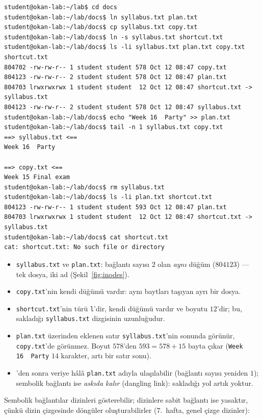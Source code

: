 \begin{lstlisting}[style=term]
student@okan-lab:~/lab$ cd docs
student@okan-lab:~/lab/docs$ ln syllabus.txt plan.txt
student@okan-lab:~/lab/docs$ cp syllabus.txt copy.txt
student@okan-lab:~/lab/docs$ ln -s syllabus.txt shortcut.txt
student@okan-lab:~/lab/docs$ ls -li syllabus.txt plan.txt copy.txt shortcut.txt
804702 -rw-rw-r-- 1 student student 578 Oct 12 08:47 copy.txt
804123 -rw-rw-r-- 2 student student 578 Oct 12 08:47 plan.txt
804703 lrwxrwxrwx 1 student student  12 Oct 12 08:47 shortcut.txt -> syllabus.txt
804123 -rw-rw-r-- 2 student student 578 Oct 12 08:47 syllabus.txt
student@okan-lab:~/lab/docs$ echo "Week 16  Party" >> plan.txt
student@okan-lab:~/lab/docs$ tail -n 1 syllabus.txt copy.txt
==> syllabus.txt <==
Week 16  Party

==> copy.txt <==
Week 15 Final exam
student@okan-lab:~/lab/docs$ rm syllabus.txt
student@okan-lab:~/lab/docs$ ls -li plan.txt shortcut.txt
804123 -rw-rw-r-- 1 student student 593 Oct 12 08:47 plan.txt
804703 lrwxrwxrwx 1 student student  12 Oct 12 08:47 shortcut.txt -> syllabus.txt
student@okan-lab:~/lab/docs$ cat shortcut.txt
cat: shortcut.txt: No such file or directory
\end{lstlisting}

\begin{itemize}
  \item \texttt{syllabus.txt} ve \texttt{plan.txt}: bağlantı sayısı $2$ olan \emph{aynı} düğüm ($804123$) --- tek dosya, iki ad (Şekil~\ref{fig:inodes}).
  \item \texttt{copy.txt}'nin kendi düğümü vardır: aynı baytları taşıyan ayrı bir dosya.
  \item \texttt{shortcut.txt}'nin türü \texttt{l}'dir, kendi düğümü vardır ve boyutu $12$'dir; bu, sakladığı \texttt{syllabus.txt} dizgisinin uzunluğudur.
  \item \texttt{plan.txt} üzerinden eklenen satır \texttt{syllabus.txt}'nin sonunda görünür, \texttt{copy.txt}'de görünmez. Boyut $578$'den $593 = 578 + 15$ bayta çıkar (\texttt{Week 16\ \ Party} $14$ karakter, artı bir satır sonu).
  \item {}'den sonra veriye hâlâ \texttt{plan.txt} adıyla ulaşılabilir (bağlantı sayısı yeniden $1$); sembolik bağlantı ise \emph{askıda kalır} (dangling link): sakladığı yol artık yoktur.
\end{itemize}

Sembolik bağlantılar dizinleri gösterebilir; dizinlere sabit bağlantı ise yasaktır, çünkü dizin çizgesinde döngüler oluşturabilirler (7.~hafta, genel çizge dizinler):

